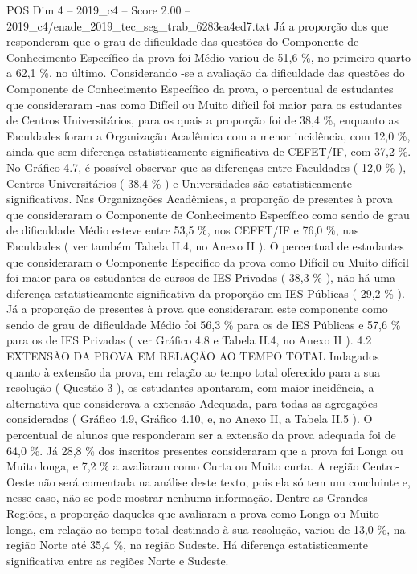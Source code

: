 \begin{textsample}{POS Dim 4 – 2019\_c4 – Score 2.00 – 2019\_c4/enade\_2019\_tec\_seg\_trab\_6283ea4ed7.txt}
Já a proporção dos que responderam que o grau de dificuldade das questões do Componente de Conhecimento Específico da prova foi Médio variou de 51,6 \%, no primeiro quarto a 62,1 \%, no último.
Considerando -se a avaliação da dificuldade das questões do Componente de Conhecimento Específico da prova, o percentual de estudantes que consideraram -nas como Difícil ou Muito difícil foi maior para os estudantes de Centros Universitários, para os quais a proporção foi de 38,4 \%, enquanto as Faculdades foram a Organização Acadêmica com a menor incidência, com 12,0 \%, ainda que sem diferença estatisticamente significativa de CEFET/IF, com 37,2 \%.
No Gráfico 4.7, é possível observar que as diferenças entre Faculdades ( 12,0 \% ), Centros Universitários ( 38,4 \% ) e Universidades são estatisticamente significativas.
Nas Organizações Acadêmicas, a proporção de presentes à prova que consideraram o Componente de Conhecimento Específico como sendo de grau de dificuldade Médio esteve entre 53,5 \%, nos CEFET/IF e 76,0 \%, nas Faculdades ( ver também Tabela II.4, no Anexo II ).
O percentual de estudantes que consideraram o Componente Específico da prova como Difícil ou Muito difícil foi maior para os estudantes de cursos de IES Privadas ( 38,3 \% ), não há uma diferença estatisticamente significativa da proporção em IES Públicas ( 29,2 \% ).
Já a proporção de presentes à prova que consideraram este componente como sendo de grau de dificuldade Médio foi 56,3 \% para os de IES Públicas e 57,6 \% para os de IES Privadas ( ver Gráfico 4.8 e Tabela II.4, no Anexo II ). 4.2 EXTENSÃO DA PROVA EM RELAÇÃO AO TEMPO TOTAL Indagados quanto à extensão da prova, em relação ao tempo total oferecido para a sua resolução ( Questão 3 ), os estudantes apontaram, com maior incidência, a alternativa que considerava a extensão Adequada, para todas as agregações consideradas ( Gráfico 4.9, Gráfico 4.10, e, no Anexo II, a Tabela II.5 ).
O percentual de alunos que responderam ser a extensão da prova adequada foi de 64,0 \%.
Já 28,8 \% dos inscritos presentes consideraram que a prova foi Longa ou Muito longa, e 7,2 \% a avaliaram como Curta ou Muito curta.
A região Centro-Oeste não será comentada na análise deste texto, pois ela só tem um concluinte e, nesse caso, não se pode mostrar nenhuma informação.
Dentre as Grandes Regiões, a proporção daqueles que avaliaram a prova como Longa ou Muito longa, em relação ao tempo total destinado à sua resolução, variou de 13,0 \%, na região Norte até 35,4 \%, na região Sudeste.
Há diferença estatisticamente significativa entre as regiões Norte e Sudeste.

\end{textsample}
